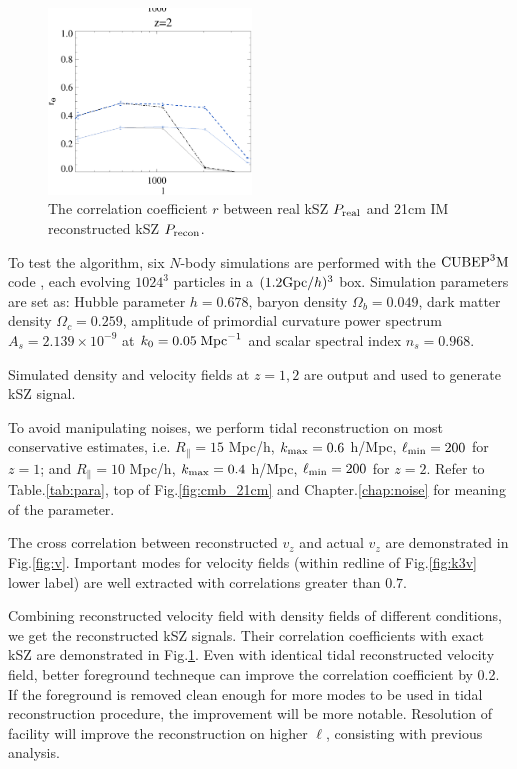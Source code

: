 \begin{figure}[tbp]
\begin{center}
\includegraphics[width=0.48\textwidth]{figure/cl_correlation_z1_z2.eps}
\end{center}
\vspace{-0.7cm}
\caption{The correlation coefficient $r$ between real kSZ $P_\mathrm{real}$ 
and 21cm IM reconstructed kSZ $P_\mathrm{recon}$.
}
\label{fig:r}
\end{figure}
\label{ssec:tide}

To test the algorithm, six $N$-body simulations are performed with the
$\mathrm{CUBEP}^3\mathrm{M}$ code \cite{2013:code}, each evolving $1024^3$ particles in a $(1.2\mathrm{Gpc}/h)^3$ box. 
Simulation parameters are set as: Hubble parameter $h=0.678$, baryon
density $\Omega_{b}=0.049$, dark matter density $\Omega_{c}=0.259$,
amplitude of primordial curvature power spectrum $A_s=2.139\times10^{-9}$ at 
$k_0=0.05\;\mathrm{Mpc}^{-1}$ and scalar spectral index $n_s=0.968$.

Simulated density and velocity fields at $z=1,2$ are output 
and used to generate kSZ signal. 


To avoid manipulating noises, 
we perform tidal reconstruction on most conservative estimates, i.e. 
$R_\parallel=15$ Mpc/h, $k_\mathrm{max}=0.6$ h/Mpc, 
$\ell_\mathrm{min}=200$ for $z=1$; 
and $R_\parallel=10$ Mpc/h, $k_\mathrm{max}=0.4$ h/Mpc, $\ell_\mathrm{min}=200$ for $z=2$. 
Refer to Table.\ref{tab:para}, top of Fig.\ref{fig:cmb_21cm} and Chapter.\ref{chap:noise} for meaning of the parameter.  

The cross correlation between reconstructed $v_z$ and actual $v_z$ are demonstrated in Fig.\ref{fig:v}. 
Important modes for velocity fields (within redline of Fig.\ref{fig:k3v} lower label) are well extracted with correlations greater than $0.7$. 

Combining reconstructed velocity field with density fields of different conditions, we get the reconstructed kSZ signals. 
Their correlation coefficients with exact kSZ are 
demonstrated in Fig.\ref{fig:r}. 
Even with identical tidal reconstructed velocity field, 
better foreground techneque can improve the correlation coefficient by 0.2. 
If the foreground is removed clean enough for more modes to be 
used in tidal reconstruction procedure, 
the improvement will be more notable.
Resolution of facility will improve the reconstruction on higher $\ell$, 
consisting with previous analysis.
